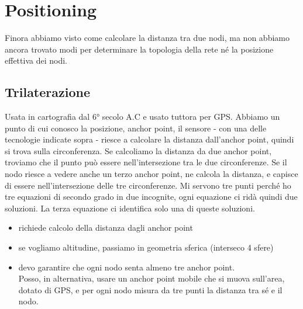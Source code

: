 \documentclass[12pt,italian]{report}
\begin{document}
\section{Positioning}
Finora abbiamo visto come calcolare la distanza tra due nodi, ma non abbiamo ancora trovato modi per determinare la topologia della rete né la posizione effettiva dei nodi.
\subsection{Trilaterazione}
Usata in cartografia dal 6° secolo A.C e usato tuttora per GPS. 
\bigbreak
Abbiamo un punto di cui conosco la posizione, anchor point, il sensore - con una delle tecnologie indicate sopra - riesce a calcolare la distanza dall'anchor point, quindi si trova sulla circonferenza. Se calcoliamo la distanza da due anchor point, troviamo che il punto può essere nell'intersezione tra le due circonferenze. Se il nodo riesce a vedere anche un terzo anchor point, ne calcola la distanza, e capisce di essere nell'intersezione delle tre circonferenze. 
\bigbreak
Mi servono tre punti perché ho tre equazioni di secondo grado in due incognite, ogni equazione ci ridà quindi due soluzioni. La terza equazione ci identifica solo una di queste soluzioni. 
\begin{itemize}
    \item richiede calcolo della distanza dagli anchor point
    \item se vogliamo altitudine, passiamo in geometria sferica (interseco 4 sfere) 
    \item devo garantire che ogni nodo senta almeno tre anchor point. \\ Posso, in alternativa, usare un anchor point mobile che si muova sull'area, dotato di GPS, e per ogni nodo misura da tre punti la distanza tra sé e il nodo. 
\end{itemize}
\end{document}
